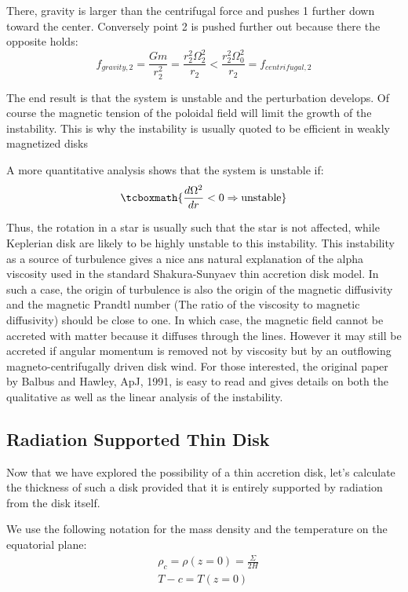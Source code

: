 \documentclass[10pt,a4paper,english]{article}
\begin{document}
There, gravity is larger than the centrifugal force and pushes 1 further  down
toward the center. Conversely point 2 is pushed further out because there the
opposite holds:
\begin{equation}
    f_{gravity,2} = \frac{Gm}{r_2^2} = \frac{r_2^2\Omega_2^2	}{r_2} <
    \frac{r_2^2\Omega_0^2}{r_2} = f_{centrifugal,2}
\end{equation}


The end result is that the system is unstable and the perturbation develops. Of
course the magnetic tension of the poloidal field will limit the growth of the
instability. This is why the instability is usually quoted to be efficient in
weakly magnetized disks

A more quantitative analysis shows that the system  is unstable if:
\begin{equation}
    \tcboxmath{\frac{d\Omega^2}{dr} < 0 \Rightarrow \text{unstable}}
\end{equation}

Thus, the rotation in a star is usually such that the star is not affected,
while Keplerian disk are likely to be highly unstable  to this instability.
This instability as a source of turbulence gives a  nice ans natural
explanation of the alpha viscosity  used in the standard Shakura-Sunyaev thin
accretion disk model. In such a case,  the origin of turbulence is also the
origin of the magnetic diffusivity and the magnetic Prandtl number (The ratio
of the viscosity to magnetic diffusivity) should be close to one. In which
case, the magnetic field cannot be accreted with matter because it diffuses
through the lines. However it may still be accreted if angular momentum is
removed not by viscosity but by an outflowing  magneto-centrifugally driven
disk wind. For those interested, the original paper by Balbus and Hawley, ApJ,
1991, is easy to read and gives details on both the qualitative as well as the
linear analysis of the instability.

\subsection{Radiation Supported Thin Disk}

Now that we have explored the possibility of a thin accretion disk, let's
calculate the thickness of such a disk provided that it is entirely supported
by radiation from the disk itself.

We use the following notation for the mass density and the temperature on the
equatorial plane:
\begin{align}
    & \rho_c = \rho(z=0) = \frac{\Sigma}{2H} \\
       & T-c = T(z=0)
\end{align}
\end{document}
